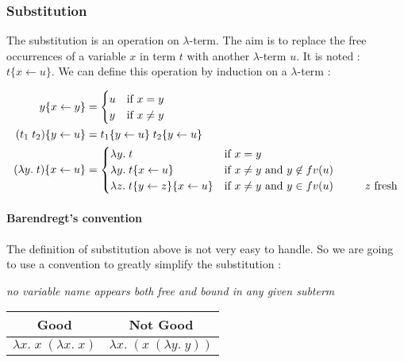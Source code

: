 \documentclass{article}
\theoremstyle{plain}
\theoremstyle{plain}
\begin{document}
  \subsubsection{Substitution}

  The substitution is an operation on $\lambda$-term. The aim is to replace the
  free occurrences of a variable $x$ in term $t$ with another $\lambda$-term
  $u$. It is noted : $t\{x \leftarrow u\}$. We can define this operation by
  induction on a $\lambda$-term :

  \begin{align*}
    y\{x \leftarrow y\} &= \begin{cases}
      u & \text{if } x = y \\
      y & \text{if } x \not = y
    \end{cases} \\
    (t_1\; t_2)\{y \leftarrow u\} &= t_1\{y \leftarrow u\}\; t_2\{y \leftarrow
    u\} \\
    (\lambda y.\;t)\{x \leftarrow u\} &= \begin{cases}
      \lambda y.\;t &\text{if } x = y \\
      \lambda y.\;t\{x\leftarrow u\} &\text{if } x \not = y \text{ and } y \not
      \in fv(u)\\
      \lambda z.\;t\{y\leftarrow z\}\{x\leftarrow u\} &\text{if } x \not = y \text{ and } y \in
      fv(u) \text{\hspace{1cm}$z$ fresh}\\
    \end{cases}
  \end{align*}

  \paragraph{Barendregt's convention} The definition of substitution above is
  not very easy to handle. So we are going to use a convention to greatly
  simplify the substitution :

  \begin{center}
    \textit{no variable name appears both free and bound in any given subterm}
  \end{center}

  \begin{center}
    \begin{tabular}{c|c}
      Good & Not Good \\
      \hline
      $\lambda x.\;x\;(\lambda x.\;x)$ & $\lambda x.\;(x\;(\lambda y.\;y))$
    \end{tabular}
  \end{center}
\end{document}
